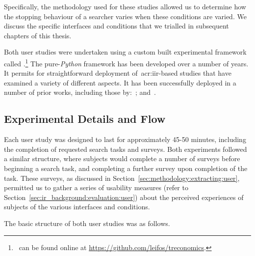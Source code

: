 Specifically, the methodology used for these studies allowed us to determine how the stopping behaviour of a searcher varies when these conditions are varied. We discuss the specific interfaces and conditions that we trialled in subsequent chapters of this thesis.

Both user studies were undertaken using a custom built experimental framework called .\footnote{\treconomics~can be found online at \url{https://github.com/leifos/treconomics}. } The pure-\emph{Python} framework has been developed over a number of years. It permits for straightforward deployment of~\gls{acr:iir}-based studies that have examined a variety of different aspects. It has been successfully deployed in a number of prior works, including those by:~\cite{azzopardi2013query_cost, maxwell2014temporal_delays, kelly2015serp_size, edwards2015query_interface}; and~\cite{crescenzi2016time_constraints}.


\subsection{Experimental Details and Flow}\label{sec:methodology:user:flow}
Each user study was designed to last for approximately 45-50 minutes, including the completion of requested search tasks and surveys. Both experiments followed a similar structure, where subjects would complete a number of surveys before beginning a search task, and completing a further survey upon completion of the task. These surveys, as discussed in Section~\ref{sec:methodology:extracting:user}, permitted us to gather a series of usability measures (refer to Section~\ref{sec:ir_background:evaluation:user}) about the perceived experiences of subjects of the various interfaces and conditions.

The basic structure of both user studies was as follows.

